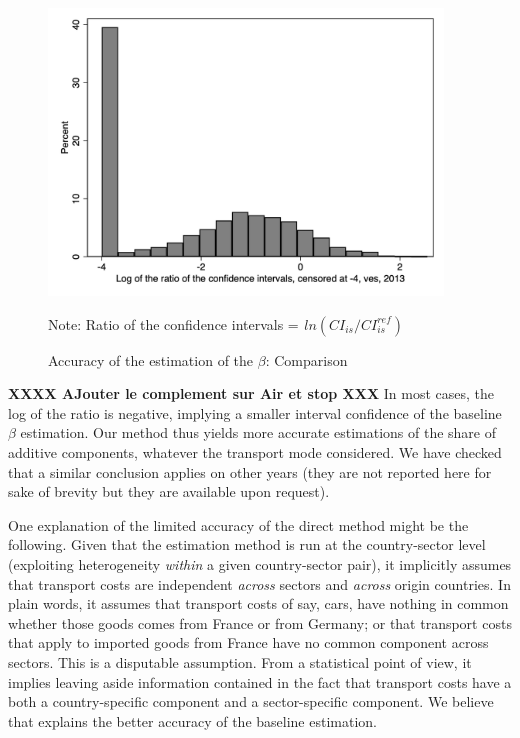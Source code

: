 \documentclass[a4paper,11pt]{article}
\begin{document}
\begin{itemize}
\begin{itemize}
    \begin{figure}[htbp]
    \caption{Accuracy of the estimation of the $\beta$: Comparison}
    \label{fig:accuracy_beta}
    \begin{center}
    \includegraphics[height=3in]{../../revised_article/comparaison_amplitude_baseline_referee1_2013_ves.png}
    \begin{minipage} [c]  {5in} \scriptsize%
    	    Note: Ratio of the confidence intervals = $ _{}ln(CI_{is}/CI^{ref}_{is})$
    \end{minipage}

    \end{center}
    \end{figure}

   \textbf{XXXX AJouter le complement sur Air et stop XXX} In most cases, the log of the ratio is negative, implying a smaller interval confidence of the baseline $\beta$ estimation. Our method thus yields more accurate estimations of the share of additive components, whatever the transport mode considered. We have checked that a similar conclusion applies on other years (they are not reported here for sake of brevity but they are available upon request).
    \end{itemize}

One explanation of the limited accuracy of the direct method might be the following. Given that the estimation method is run at the country-sector level (exploiting heterogeneity \textit{within} a given country-sector pair), it implicitly assumes that transport costs are independent \textit{across} sectors and \textit{across} origin countries. In plain words, it assumes that transport costs of say, cars, have nothing in common whether those goods comes from France or from Germany; or that transport costs that apply to imported goods from France have no common component across sectors. This is a disputable assumption. From a statistical point of view, it implies leaving aside information contained in the fact that transport costs have a both a country-specific component and a sector-specific component. We believe that explains the better accuracy of the baseline estimation.


\end{itemize}
\end{document}
